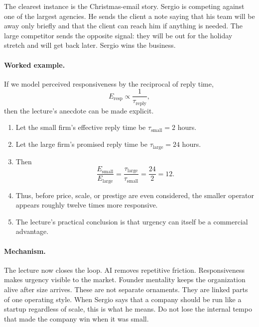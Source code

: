 The clearest instance is the Christmas-email story. Sergio is competing against one of the largest agencies. He sends the client a note saying that his team will be away only briefly and that the client can reach him if anything is needed. The large competitor sends the opposite signal: they will be out for the holiday stretch and will get back later. Sergio wins the business.

\paragraph{Worked example.}
If we model perceived responsiveness by the reciprocal of reply time,
\begin{equation}
E_{\mathrm{resp}} \propto \frac{1}{\tau_{\mathrm{reply}}},
\end{equation}
then the lecture's anecdote can be made explicit.

\begin{enumerate}
\item Let the small firm's effective reply time be \(\tau_{\mathrm{small}} = 2\) hours.
\item Let the large firm's promised reply time be \(\tau_{\mathrm{large}} = 24\) hours.
\item Then
\begin{equation}
\frac{E_{\mathrm{small}}}{E_{\mathrm{large}}}
=
\frac{\tau_{\mathrm{large}}}{\tau_{\mathrm{small}}}
=
\frac{24}{2}
=
12.
\end{equation}
\item Thus, before price, scale, or prestige are even considered, the smaller operator appears roughly twelve times more responsive.
\item The lecture's practical conclusion is that urgency can itself be a commercial advantage.
\end{enumerate}

\paragraph{Mechanism.}
The lecture now closes the loop. AI removes repetitive friction. Responsiveness makes urgency visible to the market. Founder mentality keeps the organization alive after size arrives. These are not separate ornaments. They are linked parts of one operating style. When Sergio says that a company should be run like a startup regardless of scale, this is what he means. Do not lose the internal tempo that made the company win when it was small.

